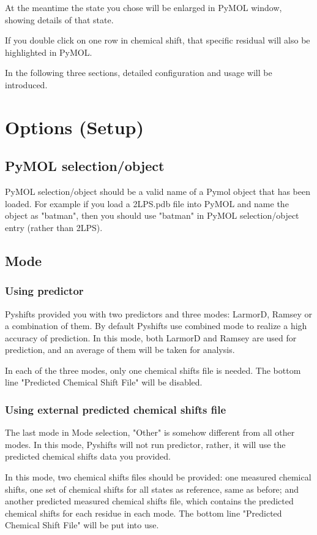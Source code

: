 \documentclass{article}
\begin{document}
At the meantime the state you chose will be enlarged in PyMOL window, showing details of that state.

If you double click on one row in chemical shift, that specific residual will also be highlighted in PyMOL.

In the following three sections, detailed configuration and usage will be introduced.
\newpage
\section{Options (Setup)}

\subsection{PyMOL selection/object}
PyMOL selection/object should be a valid name of a Pymol object that has been loaded. For example if you load a 2LPS.pdb file into PyMOL and name the object as "batman", then you should use "batman" in PyMOL selection/object entry (rather than 2LPS).
 
\subsection{Mode}
\subsubsection{Using predictor}
Pyshifts provided you with two predictors and three modes: LarmorD, Ramsey or a combination of them. By default Pyshifts use combined mode to realize a high accuracy of prediction. In this mode, both LarmorD and Ramsey are used for prediction, and an average of them will be taken for analysis.

In each of the three modes, only one chemical shifts file is needed. The bottom line "Predicted Chemical Shift File" will be disabled.
\subsubsection{Using external predicted chemical shifts file}
The last mode in Mode selection, "Other" is somehow different from all other modes. In this mode, Pyshifts will not run predictor, rather, it will use the predicted chemical shifts data you provided. 

In this mode, two chemical shifts files should be provided: one measured chemical shifts, one set of chemical shifts for all states as reference, same as before; and another predicted measured chemical shifts file, which contains the predicted chemical shifts for each residue in each mode. The bottom line "Predicted Chemical Shift File" will be put into use.
\end{document}
